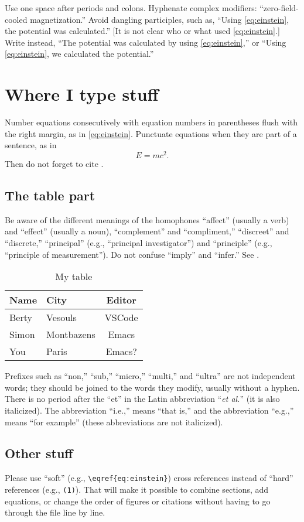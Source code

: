\documentclass[11pt]{article}
\begin{document}
Use one space after periods and colons. Hyphenate complex modifiers:
``zero-field-cooled magnetization.'' Avoid dangling participles, such as,
``Using \eqref{eq:einstein}, the potential was calculated.'' [It is not clear who or what
used \eqref{eq:einstein}.] Write instead, ``The potential was calculated by using \eqref{eq:einstein},'' or
``Using \eqref{eq:einstein}, we calculated the potential.''


\section{Where I type stuff}
\label{sec:my-stuff}

Number equations consecutively with equation numbers in parentheses
flush with the right margin, as in \eqref{eq:einstein}. Punctuate
equations when they are part of a sentence, as in
\begin{equation}\label{eq:einstein}
  E=mc^2.
\end{equation}
Then do not forget to cite \cite{Saad2002_book}.

\subsection{The table part}
\label{sec:fig}

Be aware of the different meanings of the homophones ``affect'' (usually a
verb) and ``effect'' (usually a noun), ``complement'' and ``compliment,''
``discreet'' and ``discrete,'' ``principal'' (e.g., ``principal
investigator'') and ``principle'' (e.g., ``principle of measurement''). Do
not confuse ``imply'' and ``infer.'' See \cite{getdp-ieee1999}.
\begin{table}[!h]
  \centering
  \caption{My table}
  \label{tab:student}
  \begin{tabular}{ll|c}
    Name & City & Editor \\
    \hline
    Berty & Vesouls & VSCode \\
    Simon & Montbazens & Emacs \\
    You & Paris & Emacs?
  \end{tabular}
\end{table}
Prefixes such as ``non,'' ``sub,'' ``micro,'' ``multi,'' and ``ultra'' are
not independent words; they should be joined to the words they modify,
usually without a hyphen. There is no period after the ``et'' in the Latin
abbreviation ``\emph{et al.}'' (it is also italicized). The abbreviation ``i.e.,'' means
``that is,'' and the abbreviation ``e.g.,'' means ``for example'' (these
abbreviations are not italicized).


\subsection{Other stuff}
\label{sec:other}

Please use ``soft'' (e.g., \verb|\eqref{eq:einstein}|) cross references instead
of ``hard'' references (e.g., \verb|(1)|). That will make it possible
to combine sections, add equations, or change the order of figures or
citations without having to go through the file line by line.



\end{document}
